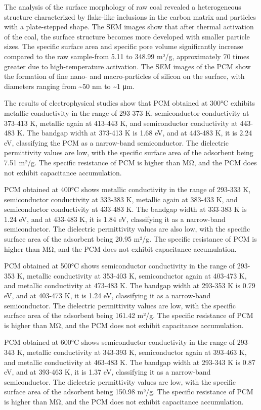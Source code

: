 \begin{multicols}{2}
The analysis of the surface morphology of raw coal revealed a
heterogeneous structure characterized by flake-like inclusions in the
carbon matrix and particles with a plate-stepped shape. The SEM images
show that after thermal activation of the coal, the surface structure
becomes more developed with smaller particle sizes. The specific surface
area and specific pore volume significantly increase compared to the raw
sample-from 5.11 to 348.99 m²/g, approximately 70 times greater due to
high-temperature activation. The SEM images of the PCM show the
formation of fine nano- and macro-particles of silicon on the surface,
with diameters ranging from \textasciitilde50 nm to \textasciitilde1 μm.

The results of electrophysical studies show that PCM obtained at 300°C
exhibits metallic conductivity in the range of 293-373 K, semiconductor
conductivity at 373-413 K, metallic again at 413-443 K, and
semiconductor conductivity at 443-483 K. The bandgap width at 373-413 K
is 1.68 eV, and at 443-483 K, it is 2.24 eV, classifying the PCM as a
narrow-band semiconductor. The dielectric permittivity values are low,
with the specific surface area of the adsorbent being 7.51 m²/g. The
specific resistance of PCM is higher than MΩ, and the PCM does not
exhibit capacitance accumulation.

PCM obtained at 400°C shows metallic conductivity in the range of
293-333 K, semiconductor conductivity at 333-383 K, metallic again at
383-433 K, and semiconductor conductivity at 433-483 K. The bandgap
width at 333-383 K is 1.24 eV, and at 433-483 K, it is 1.84 eV,
classifying it as a narrow-band semiconductor. The dielectric
permittivity values are also low, with the specific surface area of the
adsorbent being 20.95 m²/g. The specific resistance of PCM is higher
than MΩ, and the PCM does not exhibit capacitance accumulation.

PCM obtained at 500°C shows semiconductor conductivity in the range of
293-353 K, metallic conductivity at 353-403 K, semiconductor again at
403-473 K, and metallic conductivity at 473-483 K. The bandgap width at
293-353 K is 0.79 eV, and at 403-473 K, it is 1.24 eV, classifying it as
a narrow-band semiconductor. The dielectric permittivity values are low,
with the specific surface area of the adsorbent being 161.42 m²/g. The
specific resistance of PCM is higher than MΩ, and the PCM does not
exhibit capacitance accumulation.

PCM obtained at 600°C shows semiconductor conductivity in the range of
293-343 K, metallic conductivity at 343-393 K, semiconductor again at
393-463 K, and metallic conductivity at 463-483 K. The bandgap width at
293-343 K is 0.87 eV, and at 393-463 K, it is 1.37 eV, classifying it as
a narrow-band semiconductor. The dielectric permittivity values are low,
with the specific surface area of the adsorbent being 150.98 m²/g. The
specific resistance of PCM is higher than MΩ, and the PCM does not
exhibit capacitance accumulation.


\end{multicols}

